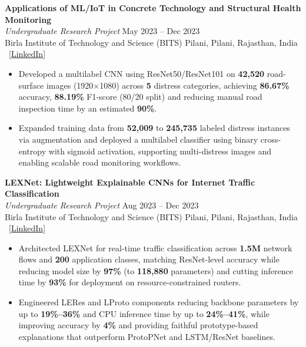 \documentclass[11pt,letterpaper]{article}
\begin{document}
\vspace{6pt}
\textbf{Applications of ML/IoT in Concrete Technology and Structural Health Monitoring}\\
\textit{Undergraduate Research Project} \hfill May 2023 -- Dec 2023\\
Birla Institute of Technology and Science (BITS) Pilani, Pilani, Rajasthan, India \textbar\ \href{https://www.linkedin.com/in/namit-shrivastava-baab47204/details/projects/}{[LinkedIn]}
\begin{itemize}[leftmargin=16pt, noitemsep, topsep=2pt]
    \item Developed a multilabel CNN using ResNet50/ResNet101 on \textbf{42,520} road-surface images (1920$\times$1080) across \textbf{5} distress categories, achieving \textbf{86.67\%} accuracy, \textbf{88.19\%} F1-score (80/20 split) and reducing manual road inspection time by an estimated \textbf{90\%}.
    \item Expanded training data from \textbf{52,009} to \textbf{245,735} labeled distress instances via augmentation and deployed a multilabel classifier using binary cross-entropy with sigmoid activation, supporting multi-distress images and enabling scalable road monitoring workflows.
\end{itemize}

\vspace{6pt}
\textbf{LEXNet: Lightweight Explainable CNNs for Internet Traffic Classification}\\
\textit{Undergraduate Research Project} \hfill Aug 2023 -- Dec 2023\\
Birla Institute of Technology and Science (BITS) Pilani, Pilani, Rajasthan, India \textbar\ \href{https://www.linkedin.com/in/namit-shrivastava-baab47204/details/projects/}{[LinkedIn]}
\begin{itemize}[leftmargin=16pt, noitemsep, topsep=2pt]
    \item Architected LEXNet for real-time traffic classification across \textbf{1.5M} network flows and \textbf{200} application classes, matching ResNet-level accuracy while reducing model size by \textbf{97\%} (to \textbf{118,880} parameters) and cutting inference time by \textbf{93\%} for deployment on resource-constrained routers.
    \item Engineered LERes and LProto components reducing backbone parameters by up to \textbf{19\%--36\%} and CPU inference time by up to \textbf{24\%--41\%}, while improving accuracy by \textbf{4\%} and providing faithful prototype-based explanations that outperform ProtoPNet and LSTM/ResNet baselines.
\end{itemize}
\end{document}
